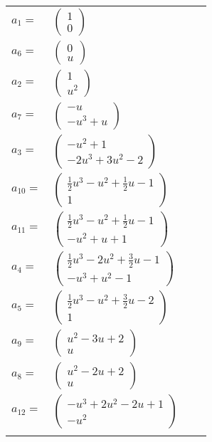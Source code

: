 \documentclass[1p]{elsarticle_modified}
\theoremstyle{definition}
\begin{document}
\begin{tabular}{m{7pt} m{180pt} m{7pt} m{180pt} }
\flushright $a_{1}=$&$\begin{pmatrix}1\\0\end{pmatrix}$ \\
\flushright $a_{6}=$&$\begin{pmatrix}0\\u\end{pmatrix}$ \\
\flushright $a_{2}=$&$\begin{pmatrix}1\\u^2\end{pmatrix}$ \\
\flushright $a_{7}=$&$\begin{pmatrix}- u\\- u^3+u\end{pmatrix}$ \\
\flushright $a_{3}=$&$\begin{pmatrix}- u^2+1\\-2 u^3+3 u^2-2\end{pmatrix}$ \\
\flushright $a_{10}=$&$\begin{pmatrix}\frac{1}{2} u^3- u^2+\frac{1}{2} u-1\\1\end{pmatrix}$ \\
\flushright $a_{11}=$&$\begin{pmatrix}\frac{1}{2} u^3- u^2+\frac{1}{2} u-1\\- u^2+u+1\end{pmatrix}$ \\
\flushright $a_{4}=$&$\begin{pmatrix}\frac{1}{2} u^3-2 u^2+\frac{3}{2} u-1\\- u^3+u^2-1\end{pmatrix}$ \\
\flushright $a_{5}=$&$\begin{pmatrix}\frac{1}{2} u^3- u^2+\frac{3}{2} u-2\\1\end{pmatrix}$ \\
\flushright $a_{9}=$&$\begin{pmatrix}u^2-3 u+2\\u\end{pmatrix}$ \\
\flushright $a_{8}=$&$\begin{pmatrix}u^2-2 u+2\\u\end{pmatrix}$ \\
\flushright $a_{12}=$&$\begin{pmatrix}- u^3+2 u^2-2 u+1\\- u^2\end{pmatrix}$\\&\end{tabular}
\end{document}
